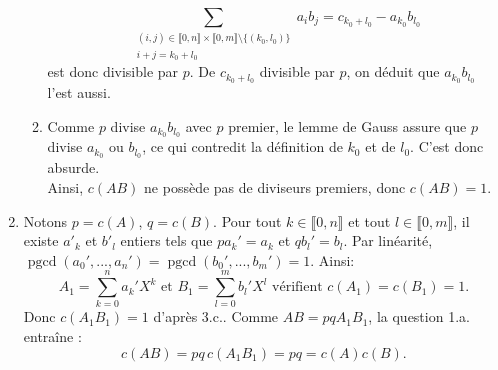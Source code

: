 \begin{enumerate}
\begin{enumerate}
\begin{displaymath}
\sum_{\substack{(i,j)\in \llbracket 0, n\rrbracket \times \llbracket 0, m\rrbracket \setminus \{ (k_{0},l_{0}) \}\\ i + j = k_{0}+l_{0}}}a_{i}b_{j} 
= c_{k_0+l_0} - a_{k_0}b_{l_0}
\end{displaymath}
est donc divisible par $p$. De $c_{k_{0}+l_{0}}$ divisible par $p$, on déduit que $a_{k_{0}}b_{l_{0}}$ l'est aussi. 
   \item Comme $p$ divise $a_{k_{0}}b_{l_{0}}$ avec $p$ premier, le lemme de Gauss assure que $p$ divise $a_{k_{0}}$ ou $b_{l_{0}}$, ce qui contredit la définition de $k_{0}$ et de $l_{0}$. C'est donc absurde. \\
    Ainsi, $c(AB)$ ne possède pas de diviseurs premiers, donc $c(AB) = 1$.
  \end{enumerate}
           
  \item Notons $p = c(A)$, $q = c(B)$. Pour tout $k\in \llbracket 0, n\rrbracket$ et tout $l\in \llbracket 0, m\rrbracket$, il existe $a'_k$ et $b'_l$ entiers tels que $pa_{k}' = a_{k}$ et $qb_{l}' = b_{l}$.\newline
  Par linéarité, $\operatorname{pgcd}(a_{0}', ..., a_{n}') = \operatorname{pgcd}(b_{0}',...,b_{m}') = 1$. Ainsi:
\[ 
A_{1} = \sum_{k=0}^{n}a_{k}'X^{k} \text{ et } B_{1} = \sum_{l=0}^{m}b_{l}'X^{l} \text{ vérifient }c(A_{1}) = c(B_{1}) = 1. 
\]
 Donc $c(A_{1}B_{1}) = 1$ d'après 3.c..  Comme $AB = pqA_{1}B_{1}$, la question 1.a. entraîne :
\[ 
c(AB) = pq\, c(A_{1}B_{1}) = pq = c(A)c(B). 
\]       


\end{enumerate}
